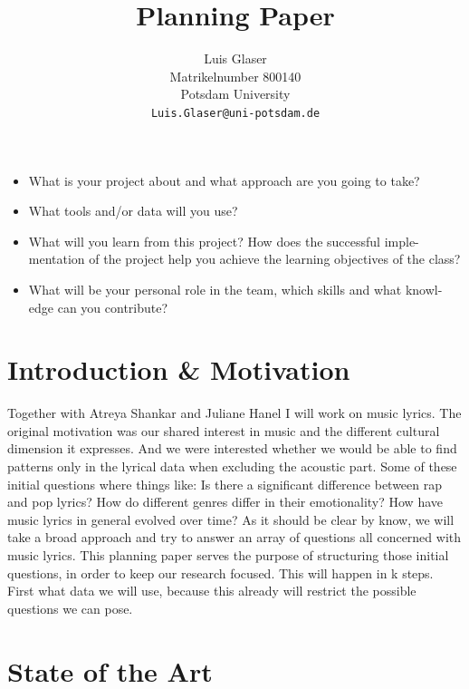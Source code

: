 \documentclass[11pt,a4paper]{article}
\title{Planning Paper}
\author{Luis Glaser\\
  Matrikelnumber 800140 \\
  Potsdam University \\
  {\tt Luis.Glaser@uni-potsdam.de}
  \\}
\date{}
\begin{document}
\maketitle
\begin{itemize}
\item What is your project about and what approach are you going to take?
\item What tools and/or data will you use?
\item What will you learn from this project? How does the successful imple- mentation of the project help you achieve the learning objectives of the class?
\item What will be your personal role in the team, which skills and what knowl- edge can you contribute?
\end{itemize}


\section{Introduction \& Motivation}

Together with Atreya Shankar and Juliane Hanel I will work on music lyrics. The original motivation was our shared interest in music and the different cultural dimension it expresses. And we were interested whether we would be able to find patterns only in the lyrical data when excluding the acoustic part. Some of these initial questions where things like: Is there a significant difference between rap and pop lyrics? How do different genres differ in their emotionality? How have music lyrics in general evolved over time? As it should be clear by know, we will take a broad approach and try to answer an array of questions all concerned with music lyrics.
This planning paper serves the purpose of structuring those initial questions, in order to keep our research focused. This will happen in k%
 steps. First what data we will use, because this already will restrict the possible questions we can pose. 

\section{State of the Art}
\end{document}
